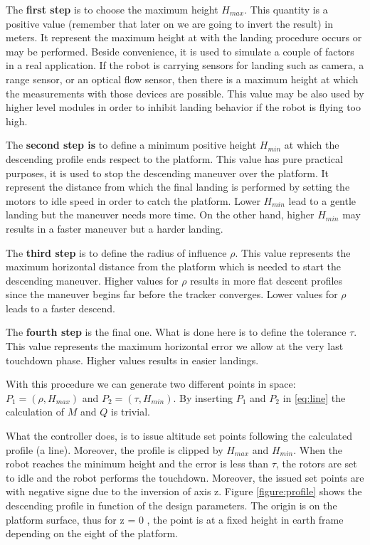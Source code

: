 The \textbf{first step} is to choose the maximum height $H_{max}$. This quantity is a positive value (remember that later on we are going to invert the result) in meters. It represent the maximum height at with the landing procedure occurs or may be performed. Beside convenience, it is used to simulate a couple of factors in a real application. If the robot is carrying sensors for landing such as camera, a range sensor, or an optical flow sensor, then there is a maximum height at which the measurements with those devices are possible. This value may be also used by higher level modules in order to inhibit landing behavior if the robot is flying too high. 

The \textbf{second step is} to define a minimum positive height $H_{min}$ at which the descending profile ends respect to the platform. This value has pure practical purposes, it is used to stop the descending maneuver over the platform. It represent the distance from which the final landing is performed by setting the motors to idle speed in order to catch the platform. Lower $H_{min}$ lead to a gentle landing but the maneuver needs more time. On the other hand, higher $H_{min}$ may results in a faster maneuver but a harder landing.

The \textbf{third step} is to define the radius of influence $\rho$. This value represents the maximum horizontal distance from the platform which is needed to start the descending maneuver.  Higher values for  $\rho$ results in more flat descent profiles since the maneuver begins far before the tracker converges. Lower values for  $\rho$ leads to a faster descend.

The \textbf{fourth step} is the final one. What is done here is to define the tolerance $\tau$. This value represents the maximum horizontal error we allow at the very last touchdown phase. Higher values results in easier landings.

With this procedure we can generate two different points in space: $P_1 = \left(\rho , H_{max}\right)$ and  $P_2 = \left(\tau , H_{min}\right)$. By inserting $P_1$ and $P_2$ in \eqref{eq:line} the calculation of $M$ and $Q$ is trivial.

What the controller does, is to issue altitude set points following the calculated profile (a line). Moreover, the profile is clipped by $H_{max}$ and $H_{min}$. When the robot reaches the minimum height and the error is less than $\tau$, the rotors are set to idle and the robot performs the touchdown. Moreover, the issued set points are with negative signe due to the inversion of axis z.
Figure \ref{figure:profile} shows the descending profile in function of the design parameters. The origin is on the platform surface, thus for z = 0 , the point is at a fixed height in earth frame depending on the eight of the platform.\\

